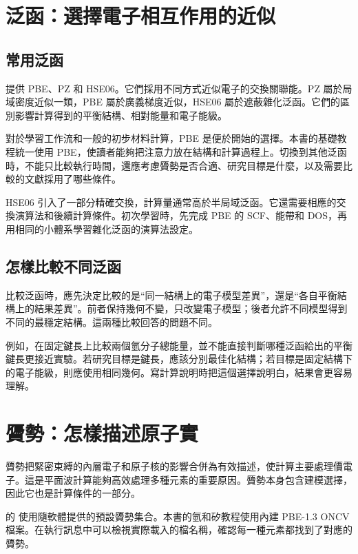 \section{泛函：選擇電子相互作用的近似}

\subsection{常用泛函}

 提供 PBE、PZ 和 HSE06。它們採用不同方式近似電子的交換關聯能。PZ 屬於局域密度近似一類，PBE 屬於廣義梯度近似，HSE06 屬於遮蔽雜化泛函。它們的區別影響計算得到的平衡結構、相對能量和電子能級。

對於學習工作流和一般的初步材料計算，PBE 是便於開始的選擇。本書的基礎教程統一使用 PBE，使讀者能夠把注意力放在結構和計算過程上。切換到其他泛函時，不能只比較執行時間，還應考慮贗勢是否合適、研究目標是什麼，以及需要比較的文獻採用了哪些條件。

HSE06 引入了一部分精確交換，計算量通常高於半局域泛函。它還需要相應的交換演算法和後續計算條件。初次學習時，先完成 PBE 的 SCF、能帶和 DOS，再用相同的小體系學習雜化泛函的演算法設定。

\subsection{怎樣比較不同泛函}

比較泛函時，應先決定比較的是“同一結構上的電子模型差異”，還是“各自平衡結構上的結果差異”。前者保持幾何不變，只改變電子模型；後者允許不同模型得到不同的最穩定結構。這兩種比較回答的問題不同。

例如，在固定鍵長上比較兩個氫分子總能量，並不能直接判斷哪種泛函給出的平衡鍵長更接近實驗。若研究目標是鍵長，應該分別最佳化結構；若目標是固定結構下的電子能級，則應使用相同幾何。寫計算說明時把這個選擇說明白，結果會更容易理解。

\section{贗勢：怎樣描述原子實}

贗勢把緊密束縛的內層電子和原子核的影響合併為有效描述，使計算主要處理價電子。這是平面波計算能夠高效處理多種元素的重要原因。贗勢本身包含建模選擇，因此它也是計算條件的一部分。

 的  使用隨軟體提供的預設贗勢集合。本書的氫和矽教程使用內建 PBE-1.3 ONCV 檔案。在執行訊息中可以檢視實際載入的檔名稱，確認每一種元素都找到了對應的贗勢。

